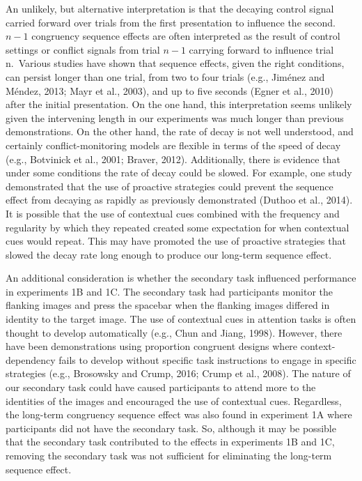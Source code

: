 \documentclass[]{DissertateCUNY}
\begin{document}
An unlikely, but alternative interpretation is that the decaying control
signal carried forward over trials from the first presentation to
influence the second. \(n-1\) congruency sequence effects are often
interpreted as the result of control settings or conflict signals from
trial \(n-1\) carrying forward to influence trial n.~Various studies
have shown that sequence effects, given the right conditions, can
persist longer than one trial, from two to four trials (e.g., Jiménez
and Méndez, 2013; Mayr et al., 2003), and up to five seconds (Egner et
al., 2010) after the initial presentation. On the one hand, this
interpretation seems unlikely given the intervening length in our
experiments was much longer than previous demonstrations. On the other
hand, the rate of decay is not well understood, and certainly
conflict-monitoring models are flexible in terms of the speed of decay
(e.g., Botvinick et al., 2001; Braver, 2012). Additionally, there is
evidence that under some conditions the rate of decay could be slowed.
For example, one study demonstrated that the use of proactive strategies
could prevent the sequence effect from decaying as rapidly as previously
demonstrated (Duthoo et al., 2014). It is possible that the use of
contextual cues combined with the frequency and regularity by which they
repeated created some expectation for when contextual cues would repeat.
This may have promoted the use of proactive strategies that slowed the
decay rate long enough to produce our long-term sequence effect.

An additional consideration is whether the secondary task influenced
performance in experiments 1B and 1C. The secondary task had
participants monitor the flanking images and press the spacebar when the
flanking images differed in identity to the target image. The use of
contextual cues in attention tasks is often thought to develop
automatically (e.g., Chun and Jiang, 1998). However, there have been
demonstrations using proportion congruent designs where
context-dependency fails to develop without specific task instructions
to engage in specific strategies (e.g., Brosowsky and Crump, 2016; Crump
et al., 2008). The nature of our secondary task could have caused
participants to attend more to the identities of the images and
encouraged the use of contextual cues. Regardless, the long-term
congruency sequence effect was also found in experiment 1A where
participants did not have the secondary task. So, although it may be
possible that the secondary task contributed to the effects in
experiments 1B and 1C, removing the secondary task was not sufficient
for eliminating the long-term sequence effect.
\end{document}
